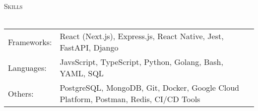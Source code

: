 \documentclass[a4paper]{article}
\newcommand{\lineunder} {
    \vspace*{-8pt} \\
    \hspace*{-12pt} \hrulefill \\
}
\newcommand{\header} [1] {
    {\hspace*{-12pt}\vspace*{6pt} \large\textsc{#1}}
    \vspace*{-6pt} \lineunder
}
\begin{document}
\header{Skills}
\vspace{1mm}
\begin{tabular}{ l l }
	Frameworks: & React (Next.js), Express.js, React Native, Jest, FastAPI, Django              \\
	Languages:  & JavsScript, TypeScript, Python, Golang, Bash, YAML, SQL                                \\
	Others:     & PostgreSQL, MongoDB, Git, Docker, Google Cloud Platform, Postman, Redis, CI/CD Tools   \\
\end{tabular}
\end{document}
